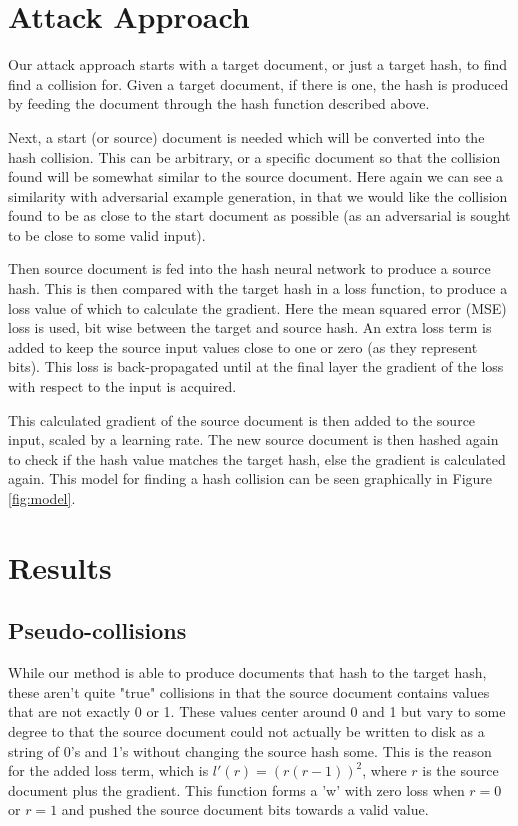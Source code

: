 \documentclass{article}
\begin{document}
\section{Attack Approach}

Our attack approach starts with a target document, or just a target hash, to
find find a collision for. Given a target document, if there is one, the hash
is produced by feeding the document through the hash function described above.

Next, a start (or source) document is needed which will be converted into the
hash collision.  This can be arbitrary, or a specific document so that the
collision found will be somewhat similar to the source document. Here again we
can see a similarity with adversarial example generation, in that we would like
the collision found to be as close to the start document as possible (as an
adversarial is sought to be close to some valid input).

Then source document is fed into the hash neural network to produce a source hash.
This is then compared with the target hash in a loss function, to produce a loss
value of which to calculate the gradient. Here the mean squared error (MSE) loss
is used, bit wise between the target and source hash. An extra loss term is
added to keep the source input values close to one or zero (as they represent bits).
This loss is back-propagated until at the final layer the gradient of the loss
with respect to the input is acquired.

This calculated gradient of the source document is then added to the source
input, scaled by a learning rate. The new source document is then hashed again
to check if the hash value matches the target hash, else the gradient is
calculated again.  This model for finding a hash collision can be seen
graphically in Figure \ref{fig:model}.

\section{Results}

\subsection{Pseudo-collisions}
While our method is able to produce documents that hash to the target hash, these
aren't quite "true" collisions in that the source document contains values that
are not exactly 0 or 1. These values center around 0 and 1 but vary to some degree
to that the source document could not actually be written to disk as a string of 0's
and 1's without changing the source hash some. This is the reason for the added
loss term, which is $l'(r) = (r (r - 1))^2$, where $r$ is the source document
plus the gradient. This function  forms a 'w' with zero loss when $r = 0$ or
$r = 1$ and pushed the source document bits towards a valid value.
\end{document}
